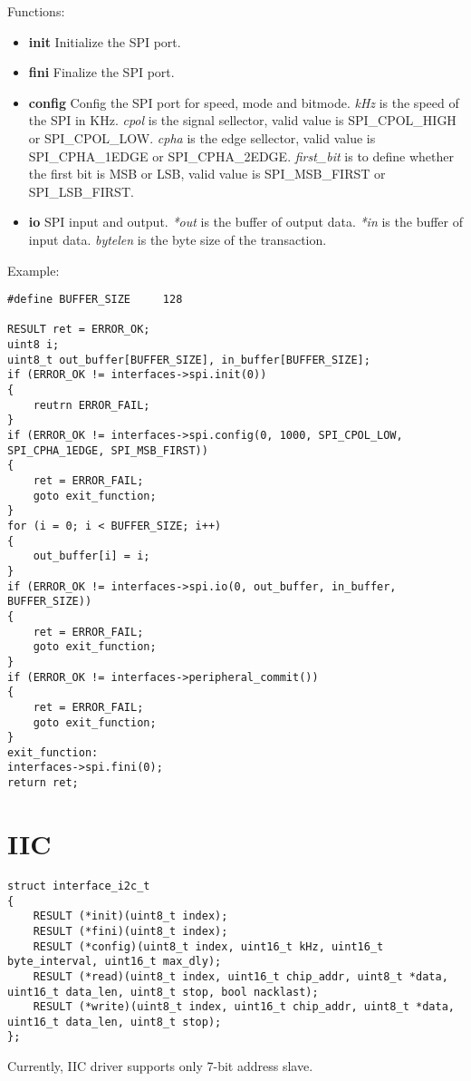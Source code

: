\documentclass[a4paper,12pt]{book}
\begin{document}
\vspace{6pt}
Functions:
\begin{itemize}
\item \textbf{init}
Initialize the SPI port.
\item \textbf{fini}
Finalize the SPI port.
\item \textbf{config}
Config the SPI port for speed, mode and bitmode.
\newline\emph{kHz} is the speed of the SPI in KHz.
\newline\emph{cpol} is the signal sellector, valid value is SPI\_CPOL\_HIGH or SPI\_CPOL\_LOW.
\newline\emph{cpha} is the edge sellector, valid value is SPI\_CPHA\_1EDGE or SPI\_CPHA\_2EDGE.
\newline\emph{first\_bit} is to define whether the first bit is MSB or LSB, valid value is SPI\_MSB\_FIRST or SPI\_LSB\_FIRST.
\item \textbf{io}
SPI input and output.
\newline\emph{*out} is the buffer of output data.
\newline\emph{*in} is the buffer of input data.
\newline\emph{bytelen} is the byte size of the transaction.
\end{itemize}

\vspace{6pt}
Example:
\begin{lstlisting}
#define BUFFER_SIZE		128

RESULT ret = ERROR_OK;
uint8 i;
uint8_t out_buffer[BUFFER_SIZE], in_buffer[BUFFER_SIZE];
if (ERROR_OK != interfaces->spi.init(0))
{
	reutrn ERROR_FAIL;
}
if (ERROR_OK != interfaces->spi.config(0, 1000, SPI_CPOL_LOW, SPI_CPHA_1EDGE, SPI_MSB_FIRST))
{
	ret = ERROR_FAIL;
	goto exit_function;
}
for (i = 0; i < BUFFER_SIZE; i++)
{
	out_buffer[i] = i;
}
if (ERROR_OK != interfaces->spi.io(0, out_buffer, in_buffer, BUFFER_SIZE))
{
	ret = ERROR_FAIL;
	goto exit_function;
}
if (ERROR_OK != interfaces->peripheral_commit())
{
	ret = ERROR_FAIL;
	goto exit_function;
}
exit_function:
interfaces->spi.fini(0);
return ret;
\end{lstlisting}

\newpage
\section{IIC}
\begin{lstlisting}
struct interface_i2c_t
{
	RESULT (*init)(uint8_t index);
	RESULT (*fini)(uint8_t index);
	RESULT (*config)(uint8_t index, uint16_t kHz, uint16_t byte_interval, uint16_t max_dly);
	RESULT (*read)(uint8_t index, uint16_t chip_addr, uint8_t *data, uint16_t data_len, uint8_t stop, bool nacklast);
	RESULT (*write)(uint8_t index, uint16_t chip_addr, uint8_t *data, uint16_t data_len, uint8_t stop);
};
\end{lstlisting}
Currently, IIC driver supports only 7-bit address slave.
\end{document}
